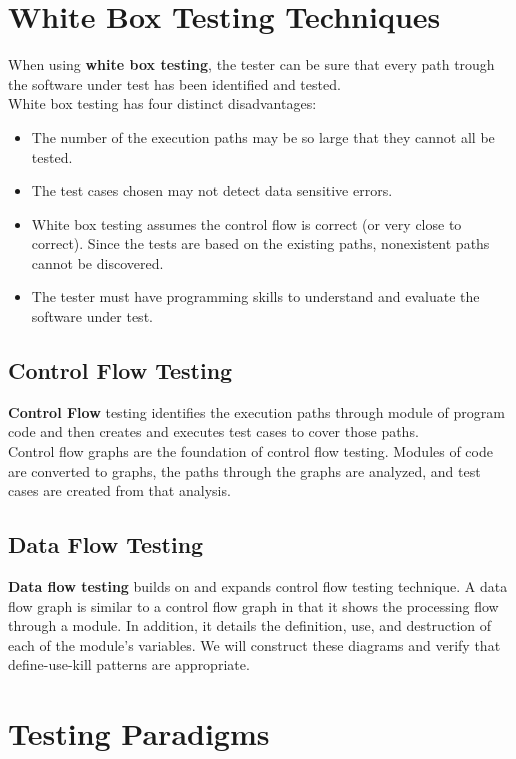 \documentclass{article}
\begin{document}
\section*{White Box Testing Techniques}
When using \textbf{white box testing}, the tester can be sure that every path trough the software under test has been identified and tested.
\\
White box testing has four distinct disadvantages:
\begin{itemize}
\item The number of the execution paths may be so large that they cannot all be tested.
\item The test cases chosen may not detect data sensitive errors.
\item White box testing assumes the control flow is correct (or very close to correct). Since the tests are based on the existing paths, nonexistent paths cannot be discovered.
\item The tester must have programming skills to understand and evaluate the software under test.
\end{itemize}

\subsection*{Control Flow Testing}
\textbf{Control Flow} testing identifies the execution paths through module of program code and then creates and executes test cases to cover those paths.
\\
Control flow graphs are the foundation of control flow testing. Modules of code are converted to graphs, the paths through the graphs are analyzed, and test cases are created from that analysis.

\subsection*{Data Flow Testing}
\textbf{Data flow testing} builds on and expands control flow testing technique. A data flow graph is similar to a control flow graph in that it shows the processing flow through a module. In addition, it details the definition, use, and destruction of each of the module's variables. We will construct these diagrams and verify that define-use-kill patterns are appropriate.

\section*{Testing Paradigms}
\end{document}
